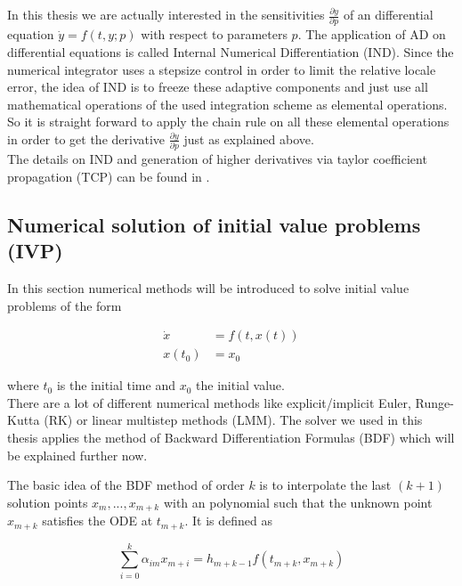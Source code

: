 \documentclass{scrartcl}[12pt, halfparskip]
\begin{document}
In this thesis we are actually interested in the sensitivities $\frac{\partial y}{\partial p}$ of an differential equation $\dot{y}=f(t,y;p)$ with respect to parameters $p$. The application of AD on differential equations is called Internal Numerical Differentiation (IND). Since the numerical integrator uses a stepsize control in order to limit the relative locale error, the idea of IND is to freeze these adaptive components and just use all mathematical operations of the used integration scheme as elemental operations. So it is straight forward to apply the chain rule on all these elemental operations in order to get the derivative $\frac{\partial y}{\partial p}$ just as explained above. \\
The details on IND and generation of higher derivatives via taylor coefficient propagation (TCP) can be found in \cite{diss_jan}.


\subsection{Numerical solution of initial value problems (IVP)}
In this section numerical methods will be introduced to solve initial value problems of the form

\begin{align}
	\dot{x} & = f(t,x(t)) \\
	x(t_0) & = x_0 \nonumber
\end{align}

where $t_0$ is the initial time and $x_0$ the initial value. \\

There are a lot of different numerical methods like explicit/implicit Euler, Runge-Kutta (RK) or linear multistep methods (LMM). The solver we used in this thesis applies the method of Backward Differentiation Formulas (BDF) which will be explained further now.

The basic idea of the BDF method of order $k$ is to interpolate the last $(k+1)$ solution points $x_m,...,x_{m+k}$ with an polynomial such that the unknown point $x_{m+k}$ satisfies the ODE at $t_{m+k}$. 
It is defined as

\begin{equation}
	\sum_{i=0}^{k} \alpha_{im} x_{m+i} = h_{m+k-1} f(t_{m+k},x_{m+k})
	\label{eq:bdf_formula}
\end{equation}
\end{document}
